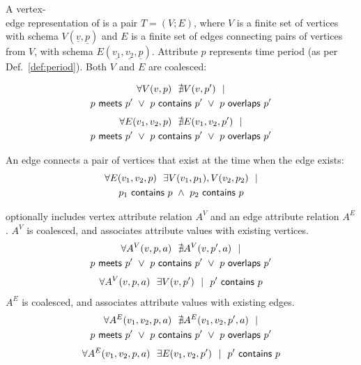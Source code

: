 \begin{definition}
A vertex-\\edge representation of \tg is a pair $T=(V; E)$, where $V$ is
a finite set of vertices with schema $V(\underline{v}, \underline{p})$
and $E$ is a finite set of edges connecting pairs of vertices from
$V$, with schema $E(\underline{v_1}, \underline{v_2}, \underline{p})$.
Attribute $p$ represents time period (as per Def.~\ref{def:period}).
Both $V$ and $E$ are coalesced:

\begin{multline}
\forall V(v, p)~~\nexists V(v, p')~~| \\
                       p~\mathsf{meets}~p'~\lor~p~\mathsf{contains}~p'~\lor~p~\mathsf{overlaps}~p'
\label{def:tg:c2}
\end{multline}
\vspace{-0.5cm}
\begin{multline}
\forall E(v_1, v_2, p)~~\nexists E(v_1,v_2, p')~~| \\
                       p~\mathsf{meets}~p'~\lor~p~\mathsf{contains}~p'~\lor~p~\mathsf{overlaps}~p'
\label{def:tg:c3}
\end{multline}

An edge connects a pair of vertices that exist at the time when the edge exists:
\begin{multline}
\forall E(v_1, v_2, p)~~\exists V(v_1, p_1), V(v_2, p_2)~~| \\
                       p_1~\mathsf{contains}~p~\wedge~p_2~\mathsf{contains}~p
\label{def:tg:c1}
\end{multline}
\vspace{-0.5cm}

 optionally includes vertex attribute relation $A^{V}$ and an
edge attribute relation $A^{E}$.  $A^{V}$ is coalesced, and associates
attribute values with existing vertices.
\begin{multline}
\forall A^{V}(v, p, a)~~\nexists A^{V}(v, p', a)~~| \\
                       p~\mathsf{meets}~p'~\lor~p~\mathsf{contains}~p'~\lor~p~\mathsf{overlaps}~p'
\label{def:tg:c4}
\end{multline}
\begin{multline}
\forall A^{V}(v, p, a)~~\exists V(v,p')~~|~~p'~\mathsf{contains}~p
\label{def:tg:c5}
\end{multline}
$A^{E}$ is coalesced, and associates attribute values with existing
edges.
\begin{multline}
\forall A^{E}(v_1, v_2, p, a)~~\nexists A^{E}(v_1, v_2, p', a)~~| \\
                       p~\mathsf{meets}~p'~\lor~p~\mathsf{contains}~p'~\lor~p~\mathsf{overlaps}~p'
\label{def:tg:c6}
\end{multline}
\begin{multline}
\forall A^{E}(v_1, v_2, p, a)~~\exists E(v_1,v_2,p')~~|~~p'~\mathsf{contains}~p
\label{def:tg:c7}
\end{multline}

\label{def:tg}
\end{definition}

